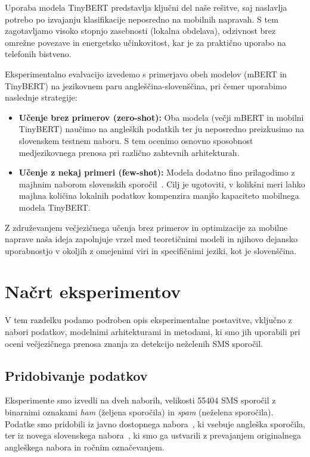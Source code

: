 \documentclass[sigconf,nonacm]{acmart}
\begin{document}
Uporaba modela TinyBERT predstavlja ključni del naše rešitve, saj naslavlja potrebo po izvajanju klasifikacije 
neposredno na mobilnih napravah. S tem zagotavljamo visoko stopnjo zasebnosti (lokalna obdelava), odzivnost brez 
omrežne povezave in energetsko učinkovitost, kar je za praktično uporabo na telefonih bistveno.

Eksperimentalno evalvacijo izvedemo s primerjavo obeh modelov (mBERT in TinyBERT) na jezikovnem paru 
angleščina-slovenščina, pri čemer uporabimo naslednje strategije:
\begin{itemize}
    \item \textbf{Učenje brez primerov (zero-shot):} Oba modela (večji mBERT in mobilni TinyBERT) naučimo na angleških podatkih ter ju neposredno preizkusimo na slovenskem testnem naboru. S tem ocenimo osnovno sposobnost medjezikovnega prenosa pri različno zahtevnih arhitekturah.
    \item \textbf{Učenje z nekaj primeri (few-shot):} Modela dodatno fino prilagodimo z majhnim naborom slovenskih sporočil~\cite{zhao2021closer}. Cilj je ugotoviti, v kolikšni meri lahko majhna količina lokalnih podatkov kompenzira manjšo kapaciteto mobilnega modela TinyBERT.
\end{itemize}

Z združevanjem večjezičnega učenja brez primerov in optimizacije za mobilne naprave naša ideja zapolnjuje vrzel med teoretičnimi modeli in njihovo dejansko uporabnostjo v okoljih z omejenimi viri in specifičnimi jeziki, kot je slovenščina.

\section{Načrt eksperimentov}

V tem razdelku podamo podroben opis eksperimentalne postavitve, vključno z nabori podatkov, modelnimi arhitekturami in metodami, 
ki smo jih uporabili pri oceni večjezičnega prenosa znanja za detekcijo neželenih SMS sporočil. 

\subsection{Pridobivanje podatkov}

Eksperimente smo izvedli na dveh naborih, velikosti 55404 SMS sporočil z binarnimi oznakami \emph{ham} (željena sporočila) in \emph{spam} 
(neželena sporočila). Podatke smo pridobili iz javno dostopnega nabora~\cite{DatasetSpamSMS}, ki vsebuje angleška sporočila, ter iz novega slovenskega 
nabora~\cite{SMSSpamSlovene}, ki smo ga ustvarili z prevajanjem originalnega angleškega nabora in ročnim označevanjem.
\end{document}

